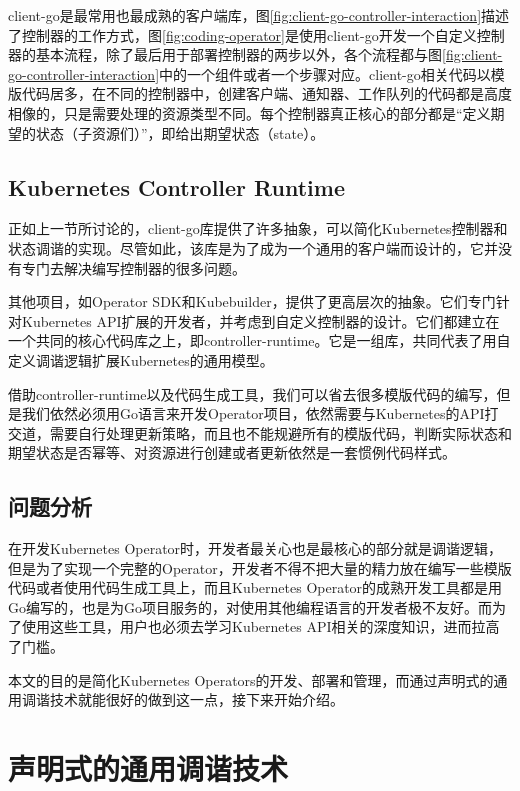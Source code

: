 \documentclass[macfonts,master]{njuthesis}
\begin{document}
client-go是最常用也最成熟的客户端库，图\ref{fig:client-go-controller-interaction}描述了控制器的工作方式，图\ref{fig:coding-operator}是使用client-go开发一个自定义控制器的基本流程，除了最后用于部署控制器的两步以外，各个流程都与图\ref{fig:client-go-controller-interaction}中的一个组件或者一个步骤对应。client-go相关代码以模版代码居多，在不同的控制器中，创建客户端、通知器、工作队列的代码都是高度相像的，只是需要处理的资源类型不同。每个控制器真正核心的部分都是``定义期望的状态（子资源们）''，即给出期望状态（state）。

\subsection{Kubernetes Controller Runtime}

正如上一节所讨论的，client-go库提供了许多抽象，可以简化Kubernetes控制器和状态调谐的实现。尽管如此，该库是为了成为一个通用的客户端而设计的，它并没有专门去解决编写控制器的很多问题。

其他项目，如Operator SDK和Kubebuilder，提供了更高层次的抽象。它们专门针对Kubernetes API扩展的开发者，并考虑到自定义控制器的设计。它们都建立在一个共同的核心代码库之上，即controller-runtime\cite{k8s-sigs}。它是一组库，共同代表了用自定义调谐逻辑扩展Kubernetes的通用模型\cite{controllerruntimedoc}\cite{k8s-sigs}。


借助controller-runtime以及代码生成工具，我们可以省去很多模版代码的编写，但是我们依然必须用Go语言来开发Operator项目，依然需要与Kubernetes的API打交道，需要自行处理更新策略，而且也不能规避所有的模版代码，判断实际状态和期望状态是否幂等、对资源进行创建或者更新依然是一套惯例代码样式。

\subsection{问题分析}

在开发Kubernetes Operator时，开发者最关心也是最核心的部分就是调谐逻辑，但是为了实现一个完整的Operator，开发者不得不把大量的精力放在编写一些模版代码或者使用代码生成工具上，而且Kubernetes Operator的成熟开发工具都是用Go编写的，也是为Go项目服务的，对使用其他编程语言的开发者极不友好。而为了使用这些工具，用户也必须去学习Kubernetes API相关的深度知识，进而拉高了门槛。

本文的目的是简化Kubernetes Operators的开发、部署和管理，而通过声明式的通用调谐技术就能很好的做到这一点，接下来开始介绍。


\section{声明式的通用调谐技术}
\end{document}
